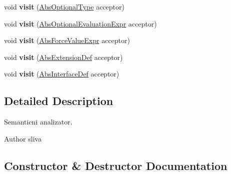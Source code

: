 \begin{DoxyCompactItemize}
\item 
\mbox{\label{classcompiler_1_1seman_1_1_sem_an_af6206b1f6c2f5f9630a0fe4a9938e837}} 
void {\bfseries visit} (\hyperlink{classcompiler_1_1abstr_1_1tree_1_1type_1_1_abs_optional_type}{Abs\+Optional\+Type} acceptor)
\item 
\mbox{\label{classcompiler_1_1seman_1_1_sem_an_a2d2b9d0576d3b0cb3652618b63f16d6a}} 
void {\bfseries visit} (\hyperlink{classcompiler_1_1abstr_1_1tree_1_1expr_1_1_abs_optional_evaluation_expr}{Abs\+Optional\+Evaluation\+Expr} acceptor)
\item 
\mbox{\label{classcompiler_1_1seman_1_1_sem_an_a215143c23e505933ebc9beddfd5e1e2b}} 
void {\bfseries visit} (\hyperlink{classcompiler_1_1abstr_1_1tree_1_1expr_1_1_abs_force_value_expr}{Abs\+Force\+Value\+Expr} acceptor)
\item 
\mbox{\label{classcompiler_1_1seman_1_1_sem_an_a17092264f1ca0854c2d32a79be03dd5b}} 
void {\bfseries visit} (\hyperlink{classcompiler_1_1abstr_1_1tree_1_1def_1_1_abs_extension_def}{Abs\+Extension\+Def} acceptor)
\item 
\mbox{\label{classcompiler_1_1seman_1_1_sem_an_a5c65ae41022b38e20da326c5537047a4}} 
void {\bfseries visit} (\hyperlink{classcompiler_1_1abstr_1_1tree_1_1def_1_1_abs_interface_def}{Abs\+Interface\+Def} acceptor)
\end{DoxyCompactItemize}


\subsection{Detailed Description}
Semanticni analizator.

\begin{DoxyAuthor}{Author}
sliva 
\end{DoxyAuthor}


\subsection{Constructor \& Destructor Documentation}
\mbox{\label{classcompiler_1_1seman_1_1_sem_an_ae36c1a3b8bbfade6901afd8c81b608e1}} 
